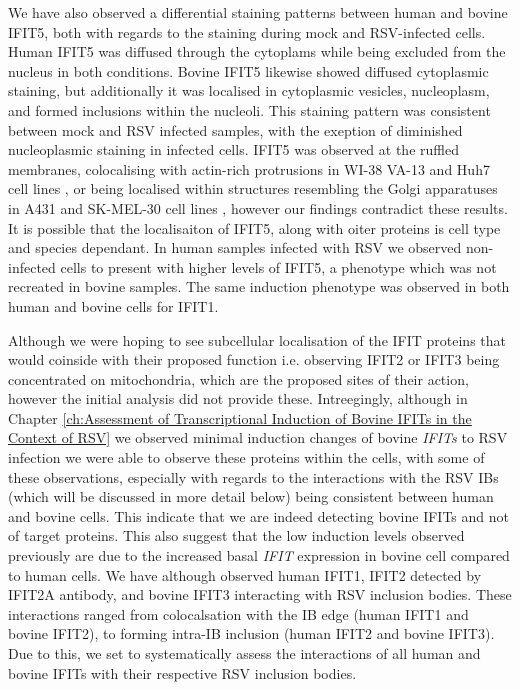 We have also observed a differential staining patterns between human and bovine IFIT5, both with regards to the staining during mock and RSV-infected cells. Human IFIT5 was diffused through the cytoplams while being excluded from the nucleus in both conditions. Bovine IFIT5 likewise showed diffused cytoplasmic staining, but additionally it was localised in cytoplasmic vesicles, nucleoplasm, and formed inclusions within the nucleoli. This staining pattern was consistent between mock and RSV infected samples, with the exeption of diminished nucleoplasmic staining in infected cells. IFIT5 was observed at the ruffled membranes, colocalising with actin-rich protrusions in WI-38 VA-13 and Huh7 cell lines \cite{Katibah2013TRNAIFIT5}, or being localised within structures resembling the Golgi apparatuses in A431 and SK-MEL-30 cell lines \cite{Thul2017AProteome}, however our findings contradict these results. It is possible that the localisaiton of IFIT5, along with oiter proteins is cell type and species dependant. In human samples infected with RSV we observed non-infected cells to present with higher levels of IFIT5, a phenotype which was not recreated in bovine samples. The same induction phenotype was observed in both human and bovine cells for IFIT1.

Although we were hoping to see subcellular localisation of the IFIT proteins that would coinside with their proposed function i.e. observing IFIT2 or IFIT3 being concentrated on mitochondria, which are the proposed sites of their action, however the initial analysis did not provide these. Intreegingly, although in Chapter \ref{ch:Assessment of Transcriptional Induction of Bovine IFITs in the Context of RSV} we observed minimal induction changes of bovine \textit{IFITs} to RSV infection we were able to observe these proteins within the cells, with some of these observations, especially with regards to the interactions with the RSV IBs (which will be discussed in more detail below) being consistent between human and bovine cells. This indicate that we are indeed detecting bovine IFITs and not of target proteins. This also suggest that the low induction levels observed previously are due to the increased basal \textit{IFIT} expression in bovine cell compared to human cells. We have although observed human IFIT1, IFIT2 detected by IFIT2A antibody, and bovine IFIT3 interacting with RSV inclusion bodies. These interactions ranged from colocalsation with the IB edge (human IFIT1 and bovine IFIT2), to forming intra-IB inclusion (human IFIT2 and bovine IFIT3). Due to this, we set to systematically assess the interactions of all human and bovine IFITs with their respective RSV inclusion bodies.

